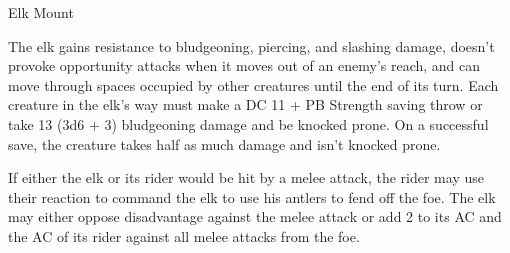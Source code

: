 \documentclass[letterpaper,twocolumn,openany,nodeprecatedcode]{dndbook}
\begin{document}
\begin{DndMonster}[float*=b,width=\textwidth + 8pt]{Elk Mount}
\begin{multicols}{2}
    The elk gains resistance to bludgeoning, piercing, and slashing damage, doesn’t provoke opportunity attacks when it moves out of an enemy’s reach, and can move through spaces occupied by other creatures until the end of its turn. Each creature in the elk’s way must make a DC 11 + PB Strength saving throw or take 13 (3d6 + 3) bludgeoning damage and be knocked prone. On a successful save, the creature takes half as much damage and isn’t knocked prone.


    If either the elk or its rider would be hit by a melee attack, the rider may use their reaction to command the elk to use his antlers to fend off the foe. The elk may either oppose disadvantage against the melee attack or add 2 to its AC and the AC of its rider against all melee attacks from the foe.

  \end{multicols}
\end{DndMonster}
\end{document}
